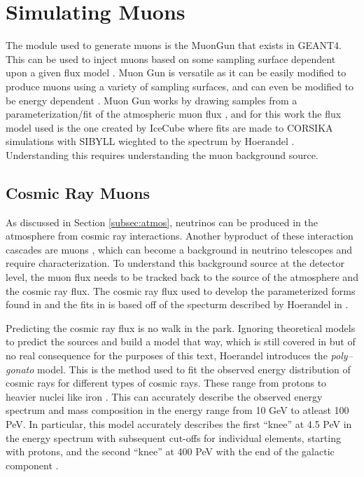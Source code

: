 \section{Simulating Muons}

The module used to generate muons is the MuonGun that exists in GEANT4. This can be used to inject muons based on some sampling surface dependent upon a given flux model \cite{icetray}. Muon Gun is versatile as it can be easily modified to produce muons using a variety of sampling surfaces, and can even be modified to be energy dependent \cite{icetray}. Muon Gun works by drawing samples from a parameterization/fit of the atmospheric muon flux \cite{icetray,muon_param}, and for this work the flux model used is the one created by IceCube \cite{icetray} where fits are made to CORSIKA \cite{corsika} simulations with SIBYLL \cite{sibyll} wieghted to the spectrum by Hoerandel \cite{hoerandel}. Understanding this requires understanding the muon background source.

\subsection{Cosmic Ray Muons}

As discussed in Section \ref{subsec:atmos}, neutrinos can be produced in the atmosphere from cosmic ray interactions. Another byproduct of these interaction cascades are muons \cite{corsika, sibyll}, which can become a background in neutrino telescopes and require characterization. To understand this background source at the detector level, the muon flux needs to be tracked back to the source of the atmosphere and the cosmic ray flux. The cosmic ray flux used to develop the parameterized forms found in \cite{muon_flux} and the fits in \cite{icecube} is based off of the specturm described by Hoerandel in \cite{hoerandel}.

Predicting the cosmic ray flux is no walk in the park. Ignoring theoretical models to predict the sources and build a model that way, which is still covered in \cite{hoerandel} but of no real consequence for the purposes of this text, Hoerandel introduces the \textit{poly--gonato} model. This is the method used to fit the observed energy distribution of cosmic rays for different types of cosmic rays. These range from protons to heavier nuclei like iron \cite{hoerandel}. This can accurately describe the observed energy spectrum and mass composition in the energy range from 10 GeV to atleast 100 PeV. In particular, this model accurately describes the first ``knee'' at 4.5 PeV in the energy spectrum with subsequent cut-offs for individual elements, starting with protons, and the second ``knee'' at 400 PeV with the end of the galactic component \cite{hoerandel}. 

